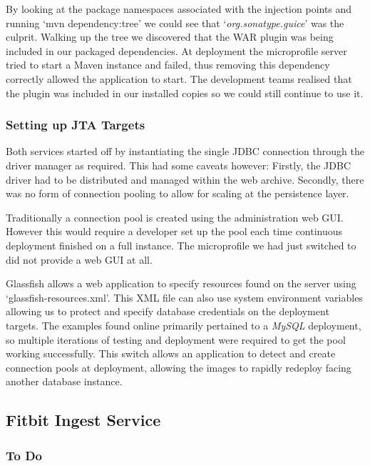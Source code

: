         \par
        By looking at the package namespaces associated with the injection points and running `mvn dependency:tree' we could see that `\textit{org.sonatype.guice}' was the culprit. Walking up the tree we discovered that the WAR plugin was being included in our packaged dependencies. At deployment the microprofile server tried to start a Maven instance and failed, thus removing this dependency correctly allowed the application to start. The development teams realised that the plugin was included in our installed copies so we could still continue to use it.

        \label{JTA_Targets}
        \subsubsection{Setting up JTA Targets}
        Both services started off by instantiating the single JDBC connection through the driver manager as required. This had some caveats however: Firstly, the JDBC driver had to be distributed and managed within the web archive. Secondly, there was no form of connection pooling to allow for scaling at the persistence layer.

        \par
        Traditionally a connection pool is created using the administration web GUI. However this would require a developer set up the pool each time continuous deployment finished on a full instance. The microprofile we had just switched to did not provide a web GUI at all.

        \par
        Glassfish allows a web application to specify resources found on the server using `glassfish-resources.xml'. This XML file can also use system environment variables allowing us to protect and specify database credentials on the deployment targets. The examples found online primarily pertained to a \textit{MySQL} deployment, so multiple iterations of testing and deployment were required to get the pool working successfully. This switch allows an application to detect and create connection pools at deployment, allowing the images to rapidly redeploy facing another database instance.

    \subsection{Fitbit Ingest Service}
        \subsubsection{To Do}

